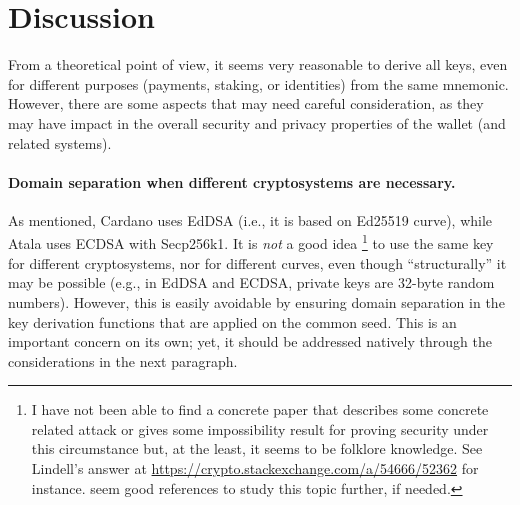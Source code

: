 \section{Discussion}
\label{sec:discussion}

From a theoretical point of view, it seems very reasonable to derive all
keys, even for different purposes (payments, staking, or identities) from
the same mnemonic. However, there are some aspects that may need careful
consideration, as they may have impact in the overall security and privacy
properties of the wallet (and related systems).

\paragraph{Domain separation when different cryptosystems are
  necessary.} %
As mentioned, Cardano uses EdDSA (i.e., it is based on Ed25519 curve),
while Atala uses ECDSA with Secp256k1. It is \emph{not} a good idea%
\footnote{I have not been able to find a concrete paper that describes
  some concrete related attack or gives some impossibility result for
  proving security under this circumstance but, at the least, it seems to
  be folklore knowledge. See Lindell's answer at
  \url{https://crypto.stackexchange.com/a/54666/52362} for instance.
  \cite{dlp12+,thorm21} seem good references to study this topic further, if
  needed.} to use the same key for different cryptosystems, nor for different
curves, even though ``structurally'' it may be possible (e.g., in EdDSA and
ECDSA, private keys are 32-byte random numbers). However, this is easily
avoidable by ensuring domain separation in the key derivation functions that
are applied on the common seed. This is an important concern on its own; yet,
it should be addressed natively through the considerations in the next
paragraph.

